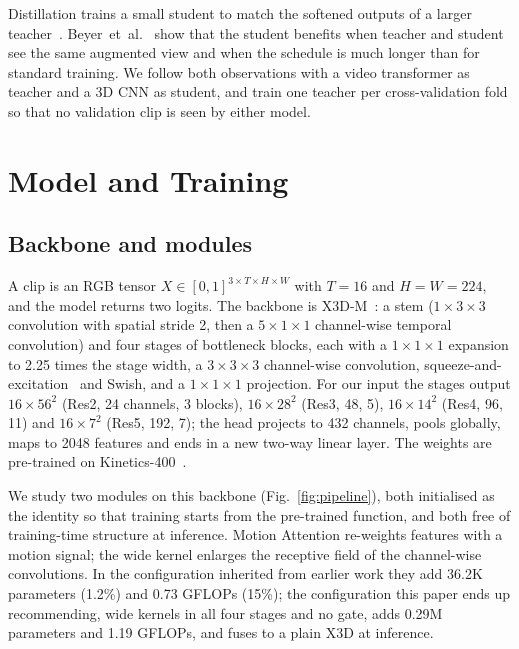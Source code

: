 \documentclass[conference]{IEEEtran}
\begin{document}
Distillation trains a small student to match the softened outputs of a
larger teacher~\cite{hinton2015}. Beyer~et~al.~\cite{beyer2022} show that
the student benefits when teacher and student see the same augmented view
and when the schedule is much longer than for standard training. We follow
both observations with a video transformer as teacher and a 3D CNN as
student, and train one teacher per cross-validation fold so that no
validation clip is seen by either model.

\section{Model and Training}
\label{sec:method}

\subsection{Backbone and modules}

A clip is an RGB tensor $X \in [0,1]^{3 \times T \times H \times W}$ with
$T=16$ and $H=W=224$, and the model returns two logits. The backbone is
X3D-M~\cite{x3d}: a stem ($1\times3\times3$ convolution with spatial stride
2, then a $5\times1\times1$ channel-wise temporal convolution) and four
stages of bottleneck blocks, each with a $1\times1\times1$ expansion to
2.25 times the stage width, a $3\times3\times3$ channel-wise convolution,
squeeze-and-excitation~\cite{se} and Swish, and a $1\times1\times1$
projection. For our input the stages output $16\times56^2$ (Res2, 24
channels, 3 blocks), $16\times28^2$ (Res3, 48, 5), $16\times14^2$ (Res4,
96, 11) and $16\times7^2$ (Res5, 192, 7); the head projects to 432
channels, pools globally, maps to 2048 features and ends in a new two-way
linear layer. The weights are pre-trained on Kinetics-400~\cite{kinetics}.

We study two modules on this backbone (Fig.~\ref{fig:pipeline}), both
initialised as the identity so that training starts from the pre-trained
function, and both free of training-time structure at inference. Motion
Attention re-weights features with a motion signal; the wide kernel
enlarges the receptive field of the channel-wise convolutions. In the
configuration inherited from earlier work they add 36.2K parameters
(1.2\%) and 0.73 GFLOPs (15\%); the configuration this paper ends up
recommending, wide kernels in all four stages and no gate, adds 0.29M
parameters and 1.19 GFLOPs, and fuses to a plain X3D at inference.
\end{document}
